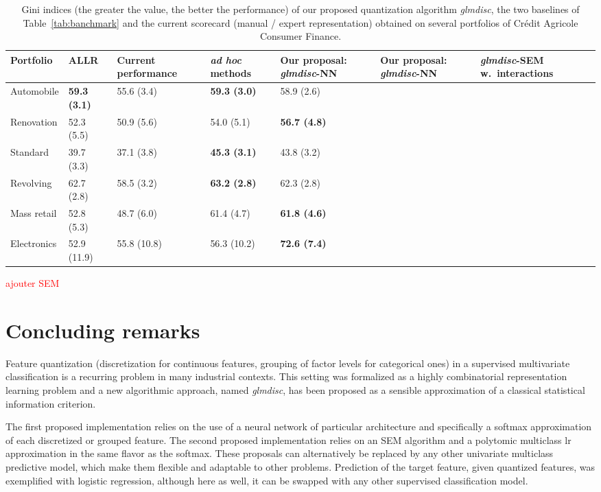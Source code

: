 \begin{table}
    \centering
        \caption{Gini indices (the greater the value, the better the performance) of our proposed quantization algorithm \textit{glmdisc}, the two baselines of Table~\ref{tab:banchmark} and the current scorecard (manual / expert representation) obtained on several portfolios of Cr\'edit Agricole Consumer Finance.}
    \label{tab:real_data}
\begin{scriptsize}
\begin{tabular}{lllllll}
Portfolio & ALLR & Current performance & \textit{ad hoc} methods & Our proposal: \textit{glmdisc}-NN & Our proposal: \textit{glmdisc}-NN & \textit{glmdisc}-SEM w.\ interactions \\
\hline
Automobile & \bf{59.3} (3.1) & 55.6 (3.4) & \bf{59.3} (3.0) & 58.9 (2.6) & & \\
Renovation & 52.3 (5.5) & 50.9 (5.6) & 54.0 (5.1) & \bf{56.7} (4.8) & & \\
Standard & 39.7 (3.3) & 37.1 (3.8) & \bf{45.3} (3.1) & 43.8 (3.2) & & \\
Revolving & 62.7 (2.8) & 58.5 (3.2) & \bf{63.2} (2.8) & 62.3 (2.8) & & \\
Mass retail & 52.8 (5.3) & 48.7 (6.0) & 61.4 (4.7) & \bf{61.8} (4.6) & & \\
Electronics & 52.9 (11.9) & 55.8 (10.8) & 56.3 (10.2)  & \bf{72.6} (7.4) & & 
\end{tabular}
\end{scriptsize}
\end{table}



\textcolor{red}{ajouter SEM}

\section{Concluding remarks}

Feature quantization (discretization for continuous features, grouping of factor levels for categorical ones) in a supervised multivariate classification is a recurring problem in many industrial contexts. This setting was formalized as a highly combinatorial representation learning problem and a new algorithmic approach, named \textit{glmdisc}, has been proposed as a sensible approximation of a classical statistical information criterion.

The first proposed implementation relies on the use of a neural network of particular architecture and specifically a softmax approximation of each discretized or grouped feature. The second proposed implementation relies on an SEM algorithm and a polytomic multiclass \gls{lr} approximation in the same flavor as the softmax. These proposals can alternatively be replaced by any other univariate multiclass predictive model, which make them flexible and adaptable to other problems. Prediction of the target feature, given quantized features, was exemplified with logistic regression, although here as well, it can be swapped with any other supervised classification model.

